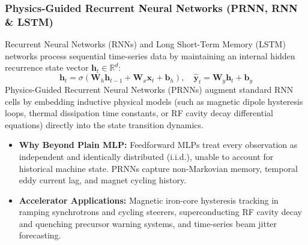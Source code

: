 \documentclass[11pt,a4paper]{article}
\begin{document}
\subsubsection{Physics-Guided Recurrent Neural Networks (PRNN, RNN \& LSTM)}
Recurrent Neural Networks (RNNs) and Long Short-Term Memory (LSTM) networks process sequential time-series data by maintaining an internal hidden recurrence state vector $\mathbf{h}_t \in \mathbb{R}^d$:
\begin{equation}
    \mathbf{h}_t = \sigma\left( \mathbf{W}_h \mathbf{h}_{t-1} + \mathbf{W}_x \mathbf{x}_t + \mathbf{b}_h \right), \quad \hat{\mathbf{y}}_t = \mathbf{W}_y \mathbf{h}_t + \mathbf{b}_y
\end{equation}
Physics-Guided Recurrent Neural Networks (PRNNs) augment standard RNN cells by embedding inductive physical models (such as magnetic dipole hysteresis loops, thermal dissipation time constants, or RF cavity decay differential equations) directly into the state transition dynamics.
\begin{itemize}
    \item \textbf{Why Beyond Plain MLP:} Feedforward MLPs treat every observation as independent and identically distributed (i.i.d.), unable to account for historical machine state. PRNNs capture non-Markovian memory, temporal eddy current lag, and magnet cycling history.
    \item \textbf{Accelerator Applications:} Magnetic iron-core hysteresis tracking in ramping synchrotrons and cycling steerers, superconducting RF cavity decay and quenching precursor warning systems, and time-series beam jitter forecasting.
\end{itemize}
\end{document}
